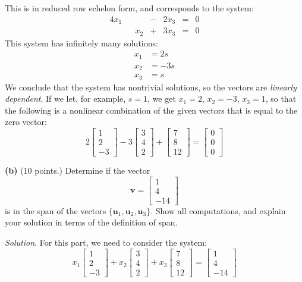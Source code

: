 \documentclass[12pt]{article}
\begin{document}
This is in reduced row echelon form, and corresponds to the system:
\begin{alignat*}{4}
x_1 & {}{} &     & {}-{} & 2x_3 & {}={} & 0\\
    & {}{} & x_2 & {}+{} & 3x_3 & {}={} & 0
\end{alignat*}
This system has infinitely many solutions:
\begin{align*}
x_1 &=  2s\\
x_2 &= -3s\\
x_3 &=   s
\end{align*}
We conclude that the system has nontrivial solutions, so the vectors are \emph{linearly dependent}. If we let, for example, $s=1$, we get $x_1=2$, $x_2=-3$, $x_3=1$, so that the following is a nonlinear combination of the given vectors that is equal to the zero vector:
\[
2\left[\begin{matrix}  1 \\ 2\\ -3\end{matrix}\right]
-3\left[\begin{matrix}  3 \\ 4\\  2\end{matrix}\right]+
\left[\begin{matrix} 7 \\ 8\\ 12\end{matrix}\right]=
\left[\begin{matrix}0\\0\\0\end{matrix}\right]
\]

\textbf{(b)} (10 points.) Determine if the vector
\[
\textbf{v}=\left[\begin{matrix}  1 \\ 4\\ -14\end{matrix}\right]
\]
is in the span of the vectors $\{\mathbf{u}_1,\mathbf{u}_2,\mathbf{u}_3\}$. Show all computations, and explain your solution in terms of the definition of span.

\emph{Solution}. For this part, we need to consider the system:
\[
x_1\left[\begin{matrix}  1 \\ 2\\ -3\end{matrix}\right]+
x_2\left[\begin{matrix}  3 \\ 4\\  2\end{matrix}\right]+
x_3\left[\begin{matrix} 7 \\ 8\\ 12\end{matrix}\right]=
\left[\begin{matrix}1\\4\\-14\end{matrix}\right]
\]
\end{document}
